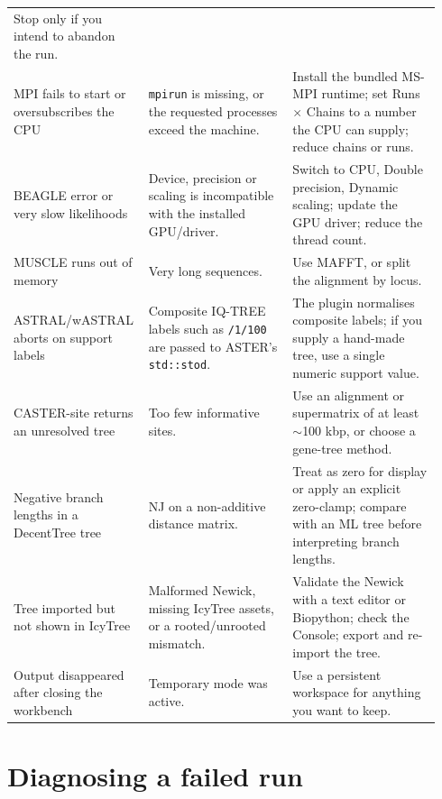 \documentclass[10pt]{report}
\begin{document}
\begin{longtable}{@{}>{\raggedright\arraybackslash}p{0.27\linewidth}
                      >{\raggedright\arraybackslash}p{0.33\linewidth}
                      >{\raggedright\arraybackslash}p{0.34\linewidth}@{}}
Stop only if you intend to abandon the run. \\
MPI fails to start or oversubscribes the CPU &
\texttt{mpirun} is missing, or the requested processes exceed the machine. &
Install the bundled MS-MPI runtime; set Runs $\times$ Chains to a number the
CPU can supply; reduce chains or runs. \\
BEAGLE error or very slow likelihoods &
Device, precision or scaling is incompatible with the installed GPU/driver. &
Switch to CPU, Double precision, Dynamic scaling; update the GPU driver; reduce
the thread count. \\
MUSCLE runs out of memory &
Very long sequences. &
Use MAFFT, or split the alignment by locus. \\
ASTRAL/wASTRAL aborts on support labels &
Composite IQ-TREE labels such as \texttt{/1/100} are passed to ASTER's
\texttt{std::stod}. &
The plugin normalises composite labels; if you supply a hand-made tree, use a
single numeric support value. \\
CASTER-site returns an unresolved tree &
Too few informative sites. &
Use an alignment or supermatrix of at least $\sim$100 kbp, or choose a
gene-tree method. \\
Negative branch lengths in a DecentTree tree &
NJ on a non-additive distance matrix. &
Treat as zero for display or apply an explicit zero-clamp; compare with an ML
tree before interpreting branch lengths. \\
Tree imported but not shown in IcyTree &
Malformed Newick, missing IcyTree assets, or a rooted/unrooted mismatch. &
Validate the Newick with a text editor or Biopython; check the Console; export
and re-import the tree. \\
Output disappeared after closing the workbench &
Temporary mode was active. &
Use a persistent workspace for anything you want to keep. \\
\bottomrule
\end{longtable}

\section{Diagnosing a failed run}
\end{document}

